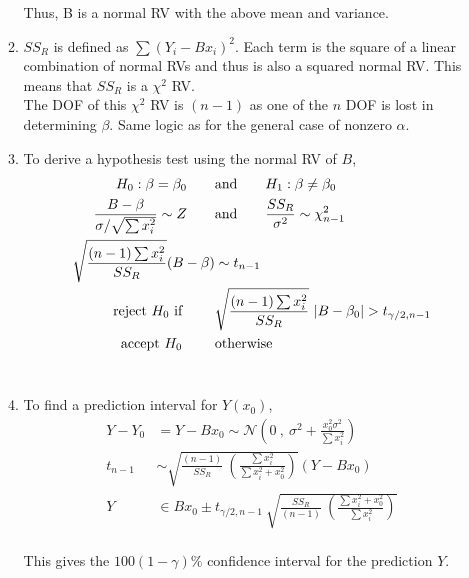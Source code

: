 \begin{enumerate}
\begin{enumerate}
	Thus, B is a normal RV with the above mean and variance.\\
	
	\item $ SS_R $ is defined as $ \sum (Y_i - Bx_i)^2 $. Each term is the square of a linear combination of normal RVs and thus is also a squared normal RV. This means that $ SS_R $ is a $ \chi^2 $ RV.\\
	The DOF of this $ \chi^2 $ RV is $ (n-1) $ as one of the $ n $ DOF is lost in determining $ \beta $. Same logic as for the general case of nonzero $ \alpha $.\\
	
	\item To derive a hypothesis test using the normal RV of $ B $, \\
	\begin{align}
		H_0 : \beta = \beta_0 \qquad &\text{and} \qquad H_1 : \beta \neq \beta_0 \nonumber \\
		\frac{B - \beta}{\sigma / \sqrt{\sum x_i^2}} \sim Z \qquad &\text{and} \qquad \frac{SS_R}{\sigma^2} \sim \chi^2_{n-1}\\
		\sqrt{\frac{(n-1)\sum x_i^2}{SS_R}} (B - \beta) &\sim t_{n-1} \nonumber \\
		\text{reject $ H_0 $ if } \qquad & \sqrt{\frac{(n-1) \sum x_i^2}{SS_R}}\ |B - \beta_0| > t_{\gamma/2, n-1} \nonumber \\
		\text{accept $ H_0 $  } \qquad & \text{otherwise}
	\end{align}\\

	\item To find a prediction interval for $ Y(x_0) $, \\
	
	\begin{align}
		Y - Y_0 &= Y - B x_0 \sim \mathcal{N}\left(0\ ,\  \sigma^2 + \frac{x_0^2 \sigma^2}{\sum x_i^2}\right) 
\nonumber\\
		t_{n-1} &\sim \sqrt{\frac{(n-1)}{SS_R}\ \left(\frac{\sum x_i^2}{\sum x_i^2 + x_0^2}\right)} (Y - B x_0)  \nonumber \\
		Y &\in B x_0 \pm t_{\gamma/2, n-1}\ \sqrt{\frac{SS_R}{(n-1)}\ \left(\frac{\sum x_i^2 + x_0^2}{\sum x_i^2}\right)} 
	\end{align}\\

	This gives the $ 100 (1 - \gamma)\% $ confidence interval for the prediction $ Y $.\\


\end{enumerate}
\end{enumerate}
